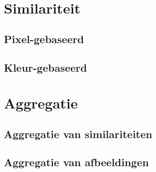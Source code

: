 \documentclass[dutch,11pt,cite,titlepage]{report}
\begin{document}


\newcommand{\auteur}{Klaas Bosteels}
\newcommand{\jaar}{2005--2006}
\newcommand{\titel}{Similariteitsgebaseerd rangschikken van afbeeldingen in zoekmachines}
\newcommand{\begeleider}{V. De Witte en S.\ Schulte}
\newcommand{\richting}{licentiaat in de informatica, optie: software-ontwikkeling}

\newcommand{\vakgroep}{Toegepaste Wiskunde en Informatica}
\newcommand{\voorzitter}{prof.\ dr.\ Guido\ Vanden\ Berghe}
\newcommand{\promotor}{prof.\ dr.\ \ E.\ E.\ Kerre}


\setcounter{page}{1}
\renewcommand{\baselinestretch}{1}

\tableofcontents %

\renewcommand{\baselinestretch}{1}
\setcounter{page}{1}









\chapter{Similariteit}

\section{Pixel-gebaseerd}
\section{Kleur-gebaseerd}

\chapter{Aggregatie}

\section{Aggregatie van similariteiten}
\section{Aggregatie van afbeeldingen}
\end{document}
